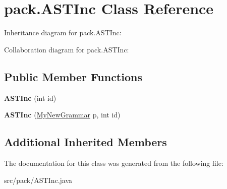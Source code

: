 \hypertarget{classpack_1_1_a_s_t_inc}{}\section{pack.\+A\+S\+T\+Inc Class Reference}
\label{classpack_1_1_a_s_t_inc}


Inheritance diagram for pack.\+A\+S\+T\+Inc\+:


Collaboration diagram for pack.\+A\+S\+T\+Inc\+:
\subsection*{Public Member Functions}
\begin{DoxyCompactItemize}
\item 
{\bfseries A\+S\+T\+Inc} (int id)\hypertarget{classpack_1_1_a_s_t_inc_a7cd800ea469076efb65b61082b10ff8c}{}\label{classpack_1_1_a_s_t_inc_a7cd800ea469076efb65b61082b10ff8c}

\item 
{\bfseries A\+S\+T\+Inc} (\hyperlink{classpack_1_1_my_new_grammar}{My\+New\+Grammar} p, int id)\hypertarget{classpack_1_1_a_s_t_inc_a15323fc8af139abb34bd83aeade7391e}{}\label{classpack_1_1_a_s_t_inc_a15323fc8af139abb34bd83aeade7391e}

\end{DoxyCompactItemize}
\subsection*{Additional Inherited Members}


The documentation for this class was generated from the following file\+:\begin{DoxyCompactItemize}
\item 
src/pack/A\+S\+T\+Inc.\+java\end{DoxyCompactItemize}
